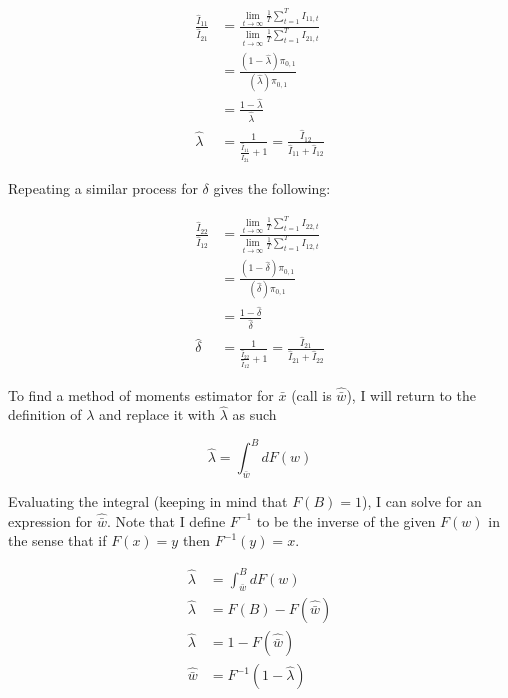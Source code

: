 \documentclass{homework}
\begin{document}
\begin{homeworkProblem}
{\begin{enumerate}[a.]
        \begin{align*}
          \frac{\hat{I}_{11}}{\hat{I}_{21}} &= \frac{\lim_{t \rightarrow \infty} \frac{1}{T} \sum_{t=1}^T I_{11, t}}{\lim_{t \rightarrow \infty} \frac{1}{T} \sum_{t=1}^T I_{21, t}} \\
            &= \frac{(1 - \hat{\lambda}) \pi_{0, 1}}{(\hat{\lambda}) \pi_{0, 1}} \\
            &= \frac{1 - \hat{\lambda}}{\hat{\lambda}} \\
            \hat{\lambda} &= \frac{1}{\frac{\hat{I}_{11}}{\hat{I}_{21}} + 1} = \frac{\hat{I}_{12}}{\hat{I}_{11}+\hat{I}_{12}}
        \end{align*}

        Repeating a similar process for $\delta$ gives the following:

        \begin{align*}
          \frac{\hat{I}_{22}}{\hat{I}_{12}} &= \frac{\lim_{t \rightarrow \infty} \frac{1}{T} \sum_{t=1}^T I_{22, t}}{\lim_{t \rightarrow \infty} \frac{1}{T} \sum_{t=1}^T I_{12, t}} \\
            &= \frac{(1 - \hat{\delta}) \pi_{0, 1}}{(\hat{\delta}) \pi_{0, 1}} \\
            &= \frac{1 - \hat{\delta}}{\hat{\delta}} \\
            \hat{\delta} &= \frac{1}{\frac{\hat{I}_{22}}{\hat{I}_{12}} + 1} = \frac{\hat{I}_{21}}{\hat{I}_{21}+\hat{I}_{22}}
        \end{align*}

        To find a method of moments estimator for $\bar{x}$ (call is $\hat{\bar{w}}$), I will return to the definition of $\lambda$ and replace it with $\hat{\lambda}$ as such

        $$ \hat{\lambda} = \int_{\bar{w}}^B d F(w)$$

        Evaluating the integral (keeping in mind that $F(B) = 1$), I can solve for an expression for $\hat{\bar{w}}$. Note that I define $F^{-1}$ to be the inverse of the given $F(w)$ in the sense that if $F(x) = y$ then $F^{-1}(y) = x$.

        \begin{align*}
          \hat{\lambda} &= \int_{\bar{w}}^B d F(w) \\
            \hat{\lambda} &= F(B) - F(\hat{\bar{w}}) \\
            \hat{\lambda} &= 1 - F(\hat{\bar{w}}) \\
            \hat{\bar{w}} &= F^{-1}(1 - \hat{\lambda})
        \end{align*}


\end{enumerate}}
\end{homeworkProblem}
\end{document}
